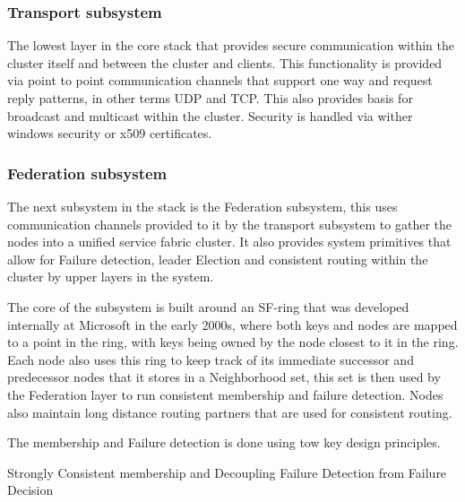 \documentclass[a4paper,10pt,titlepage]{report}
\begin{document}
    \subsubsection{Transport subsystem}
    The lowest layer in the core stack that provides secure communication within the cluster itself and between the cluster and clients. This functionality is provided via point to point communication channels that support one way and request reply patterns, in other terms UDP and TCP. This also provides basis for broadcast and multicast within the cluster. Security is handled via wither windows security or x509 certificates. \\
    \vspace{5mm}

    \subsubsection{Federation subsystem}

    The next subsystem in the stack is the Federation subsystem, this uses communication channels provided to it by the transport subsystem to gather the nodes into a unified service fabric cluster. It also provides system primitives that allow for Failure detection, leader Election and consistent routing within the cluster by upper layers in the system.\\
    \vspace{5mm}

    The core of the subsystem is built around an SF-ring that was developed internally at Microsoft in the early 2000s, where both keys and nodes are mapped to a point in the ring, with keys being owned by the node closest to it in the ring. Each node also uses this ring to keep track of its immediate successor and predecessor nodes that it stores in a Neighborhood set, this set is then used by the Federation layer to run consistent membership and failure detection. Nodes also maintain long distance routing partners that are used for consistent routing.\\
    \vspace{5mm}

    The membership and Failure detection is done using tow key design principles.\\
    \vspace{5mm}

    Strongly Consistent membership and Decoupling Failure Detection from Failure Decision\\
    \vspace{5mm}
\end{document}
